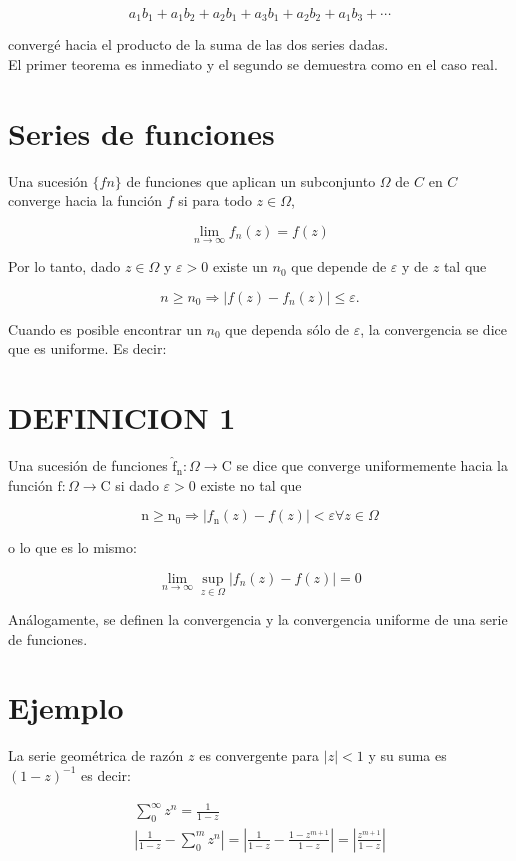 \documentclass[10pt]{article}
\theoremstyle{plain}
\theoremstyle{definition}
\theoremstyle{remark}
\begin{document}
$$
a_{1} b_{1}+a_{1} b_{2}+a_{2} b_{1}+a_{3} b_{1}+a_{2} b_{2}+a_{1} b_{3}+\cdots
$$

convergé hacia el producto de la suma de las dos series dadas.\\
El primer teorema es inmediato y el segundo se demuestra como en el caso real.

\section{Series de funciones}
Una sucesión $\{f n\}$ de funciones que aplican un subconjunto $\Omega$ de $C$ en $C$ converge hacia la función $f$ si para todo $z \in \Omega$,

$$
\lim _{n \rightarrow \infty} f_{n}(z)=f(z)
$$

Por lo tanto, dado $z \in \Omega$ y $\varepsilon>0$ existe un $n_{0}$ que depende de $\varepsilon$ y de $z$ tal que

$$
n \geqslant n_{0} \Rightarrow\left|f(z)-f_{n}(z)\right| \leqslant \varepsilon .
$$

Cuando es posible encontrar un $n_{0}$ que dependa sólo de $\varepsilon$, la convergencia se dice que es uniforme. Es decir:

\section*{DEFINICION 1}
Una sucesión de funciones $\hat{\mathrm{f}}_{\mathrm{n}}: \Omega \rightarrow \mathrm{C}$ se dice que converge uniformemente hacia la función $\mathrm{f}: \Omega \rightarrow \mathrm{C}$ si dado $\varepsilon>0$ existe no tal que

$$
\mathrm{n} \geqslant \mathrm{n}_{0} \Rightarrow\left|f_{\mathrm{n}}(z)-f(z)\right|<\varepsilon \forall z \in \Omega
$$

o lo que es lo mismo:

$$
\lim _{n \rightarrow \infty} \sup _{z \in \Omega}\left|f_{n}(z)-f(z)\right|=0
$$

Análogamente, se definen la convergencia y la convergencia uniforme de una serie de funciones.

\section*{Ejemplo}
La serie geométrica de razón $z$ es convergente para $|z|<1$ y su suma es $(1-z)^{-1}$ es decir:

$$
\begin{gathered}
\sum_{0}^{\infty} z^{n}=\frac{1}{1-z} \\
\left|\frac{1}{1-z}-\sum_{0}^{m} z^{n}\right|=\left|\frac{1}{1-z}-\frac{1-z^{m+1}}{1-z}\right|=\left|\frac{z^{m+1}}{1-z}\right|
\end{gathered}
$$
\end{document}
